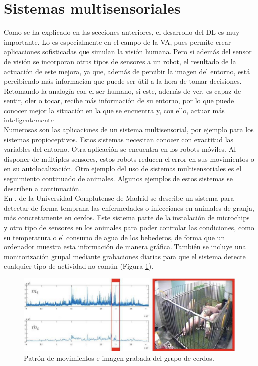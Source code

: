 \section{Sistemas multisensoriales}
Como se ha explicado en las secciones anteriores, el desarrollo del DL es muy importante. Lo es especialmente en el campo de la VA, pues permite crear aplicaciones sofisticadas que simulan la visión humana. Pero si además del sensor de visión se incorporan otros tipos de sensores a un robot, el resultado de la actuación de este mejora, ya que, además de percibir la imagen del entorno, está percibiendo más información que puede ser útil a la hora de tomar decisiones. Retomando la analogía con el ser humano, si este, además de ver, es capaz de sentir, oler o tocar, recibe más información de su entorno, por lo que puede conocer mejor la situación en la que se encuentra y, con ello, actuar más inteligentemente.\\

Numerosas son las aplicaciones de un sistema multisensorial, por ejemplo para los sistemas propioceptivos. Estos sistemas necesitan conocer con exactitud las variables del entorno. Otra aplicación se encuentra en los robots móviles. Al disponer de múltiples sensores, estos robots reducen el error en sus movimientos o en su autolocalización. Otro ejemplo del uso de sistemas multisensoriales es el seguimiento continuado de animales. Algunos ejemplos de estos sistemas se describen a continuación.\\

En \cite{ucm}, de la Universidad Complutense de Madrid se describe un sistema para detectar de forma temprana las enfermedades o infecciones en animales de granja, más concretamente en cerdos. Este sistema parte de la instalación de microchips y otro tipo de sensores en los animales para poder controlar las condiciones, como su temperatura o el consumo de agua de los bebederos, de forma que un ordenador muestra esta información de manera gráfica. También se incluye una monitorización grupal mediante grabaciones diarias para que el sistema detecte cualquier tipo de actividad no común (Figura \ref{fig:ucm}).\\
\begin{figure} [h!]
  \begin{center}
    \includegraphics[width=14cm]{figs/ucm}
  \end{center}
  \caption{Patrón de movimientos e imagen grabada del grupo de cerdos.}
  \label{fig:ucm}
\end{figure}

